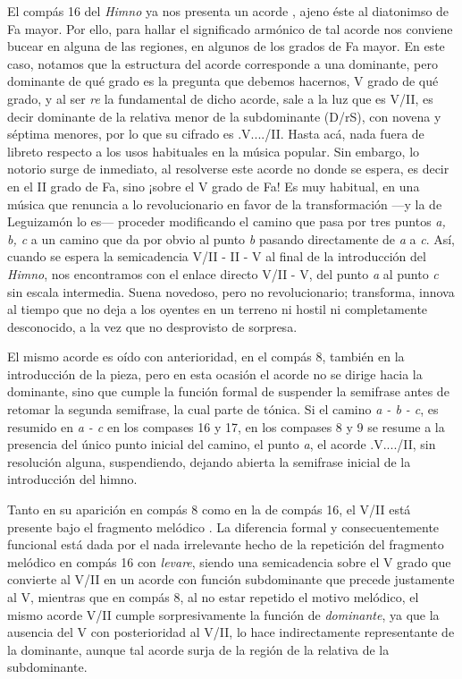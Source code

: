 El compás 16 del \emph{Himno} ya nos presenta un acorde \hbox{,} ajeno éste al diatonimso de Fa mayor. Por ello, para hallar el significado armónico de tal acorde nos conviene bucear en alguna de las regiones, en algunos de los grados de Fa mayor. En este caso, notamos que la estructura del acorde corresponde a una dominante, pero dominante de qué grado es la pregunta que debemos hacernos, V grado de qué grado, y al ser \emph{re} la fundamental de dicho acorde, sale a la luz que es V/II, es decir dominante de la relativa menor de la subdominante (D/rS), con novena y séptima menores, por lo que su cifrado es \acorde.V..../II. Hasta acá, nada fuera de libreto respecto a los usos habituales en la música popular. Sin embargo, lo notorio surge de inmediato, al resolverse este acorde no donde se espera, es decir en el II grado de Fa, sino ¡sobre el V grado de Fa! Es muy habitual, en una música que renuncia a lo revolucionario en favor de la transformación ---y la de Leguizamón lo es--- proceder modificando el camino que pasa por tres puntos \emph{a, b, c} a un camino que da por obvio al punto \emph{b} pasando directamente de \emph{a} a \emph{c}. Así, cuando se espera la semicadencia V/II - II - V al final de la introducción del \emph{Himno}, nos encontramos con el enlace directo V/II - V, del punto \emph{a} al punto \emph{c} sin escala intermedia. Suena novedoso, pero no revolucionario; transforma, innova al tiempo que no deja a los oyentes en un terreno ni hostil ni completamente desconocido, a la vez que no desprovisto de sorpresa.

El mismo acorde es oído con anterioridad, en el compás 8, también en la introducción de la pieza, pero en esta ocasión el acorde no se dirige hacia la dominante, sino que cumple la función formal de suspender la semifrase antes de retomar la segunda semifrase, la cual parte de tónica. Si el camino \emph{a - b - c}, es resumido en \emph{a - c} en los compases 16 y 17, en los compases 8 y 9 se resume a la presencia del único punto inicial del camino, el punto \emph{a}, el acorde \acorde.V..../II, sin resolución alguna, suspendiendo, dejando abierta la semifrase inicial de la introducción del himno.

Tanto en su aparición en compás 8 como en la de compás 16, el V/II está presente bajo el fragmento melódico . La diferencia formal y consecuentemente funcional está dada por el nada irrelevante hecho de la repetición del fragmento melódico  en compás 16 con \emph{levare}, siendo  una semicadencia sobre el V grado que convierte al V/II en un acorde con función subdominante que precede justamente al V, mientras que en compás 8, al no estar repetido el motivo melódico, el mismo acorde V/II cumple sorpresivamente la función de \emph{dominante}, ya que la ausencia del V con posterioridad al V/II, lo hace indirectamente representante de la dominante, aunque tal acorde surja de la región de la relativa de la subdominante.

